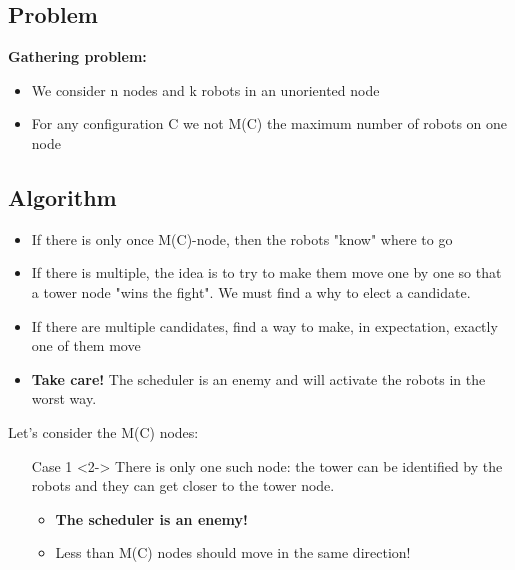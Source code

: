 \documentclass{beamer}
\begin{document}
\subsection{Problem}
\begin{frame}
\textbf{Gathering problem:}

	\begin{itemize}
		\item<2-> We consider n nodes and k robots in an unoriented node
		\item<3-> For any configuration C we not M(C) the maximum number of robots on one node
	\end{itemize}
	
\end{frame}

\subsection{Algorithm}
\begin{frame}
	\begin{itemize}
		\item<1-> If there is only once M(C)-node, then the robots "know" where to go
		\item<2-> If there is multiple, the idea is to try to make them move one by one so that a tower node "wins the fight". We must find a why to elect a candidate.
		\item<3-> If there are multiple candidates, find a way to make, in expectation, exactly one of them move
		\item<4-> \textbf{Take care!} The scheduler is an enemy and will activate the robots in the worst way.
	\end{itemize}
	
\end{frame}

\begin{frame}

	Let's consider the M(C) nodes:
	\begin{itemize}
		\item[Case 1]<2-> There is only one such node: the tower can be identified by the robots and they can get closer to the tower node.
		\begin{itemize}
			\item<3-> \textbf{The scheduler is an enemy!}
			\item<3-> Less than M(C) nodes should move in the same direction! 
		\end{itemize}
	\end{itemize}

\end{frame}
\end{document}
